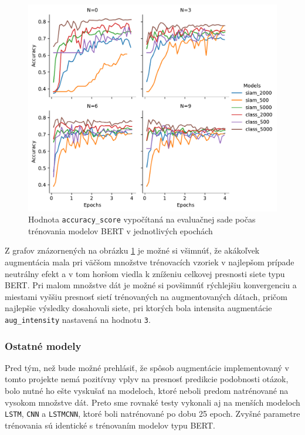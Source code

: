 \documentclass[a4paper, 16pt]{article}
\begin{document}
\begin{figure}[H]
    \centering
    \includegraphics[width=15cm]{imgs/BERT_graph.pdf}
    \caption{Hodnota \texttt{accuracy\_score} vypočítaná na evaluačnej sade počas trénovania modelov BERT v jednotlivých epochách}
    \label{fig:1}
\end{figure}

Z grafov znázornených na obrázku \ref{fig:1} je možné si všimnúť, že akákoľvek augmentácia mala pri väčšom množstve trénovacích vzoriek v najlepšom prípade neutrálny efekt a v tom horšom viedla k zníženiu celkovej presnosti siete typu BERT. Pri malom množstve dát je možné si povšimnúť rýchlejšiu konvergenciu a miestami vyššiu presnosť sietí trénovaných na augmentovaných dátach, pričom najlepšie výsledky dosahovali siete, pri ktorých bola intensita augmentácie \texttt{aug\_intensity} nastavená na hodnotu \texttt{3}.  

\subsubsection{Ostatné modely}
Pred tým, než bude možné prehlásiť, že spôsob augmentácie implementovaný v tomto projekte nemá pozitívny vplyv na presnosť predikcie podobnosti otázok, bolo nutné ho ešte vyskušať na modeloch, ktoré neboli predom natrénované na vysokom množstve dát. Preto sme rovnaké testy vykonali aj na menších modeloch \texttt{LSTM}, \texttt{CNN} a \texttt{LSTMCNN}, ktoré boli natrénované po dobu 25 epoch. Zvyšné parametre trénovania sú identické s trénovaním modelov typu BERT. 
\end{document}
